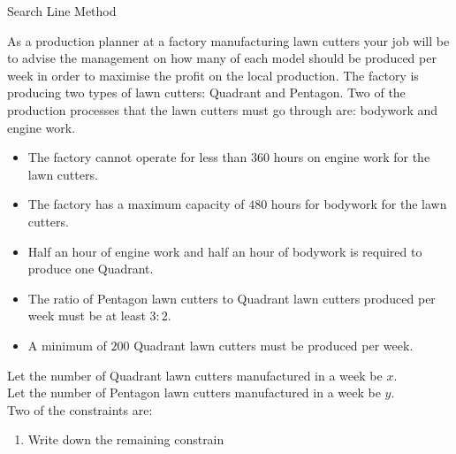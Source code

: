 \begin{wex}
{Search Line Method}{As a production planner at a factory manufacturing lawn cutters your job
will be to advise the management on how many of each model should be produced per week in
order to maximise the profit on the local production. The factory is producing two types of
lawn cutters: Quadrant and Pentagon.
Two of the production processes that the lawn cutters must go through are: bodywork and engine
work.
\begin{itemize}
\item{The factory cannot operate for less than $360$ hours on engine work for the lawn cutters.}
\item{The factory has a maximum capacity of $480$ hours for bodywork for the lawn cutters.}
\item{Half an hour of engine work and half an hour of bodywork is required to produce one
Quadrant.}
\item{The ratio of Pentagon lawn cutters to Quadrant lawn cutters produced per week must be at
least $3:2$.}
\item{A minimum of $200$ Quadrant lawn cutters must be produced per week.}
\end{itemize}
Let the number of Quadrant lawn cutters manufactured in a week be $x$.\\
Let the number of Pentagon lawn cutters manufactured in a week be $y$.\\
Two of the constraints are:
\begin{enumerate}
\item{Write down the remaining constrain
}
\end{enumerate}}
\end{wex}
